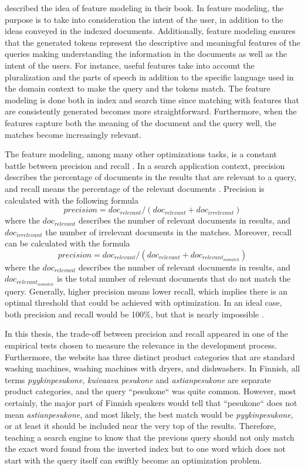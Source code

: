 \citeauthor{relevantSearch} \cite{relevantSearch} described the idea of feature modeling in their book.
In feature modeling, the purpose is to take into consideration the intent of the user, 
in addition to the ideas conveyed in the indexed documents.
Additionally, feature modeling ensures that the generated tokens represent the descriptive and meaningful
features of the queries making understanding the information in the documents as well as the intent of the users.
For instance, useful features take into account the pluralization and the parts of speech in addition to the specific language
used in the domain context to make the query and the tokens match.
The feature modeling is done both in index and search time
since matching with features that are consistently generated becomes more straightforward. 
Furthermore, when the features capture both the meaning of the document and the query well, 
the matches become increasingly relevant.
\cite{relevantSearch}

The feature modeling, among many other optimizations tasks, is a constant battle between 
precision and recall \cite{relevantSearch}.
In a search application context, precision describes the percentage of documents in the results 
that are relevant to a query, and recall means the percentage of the relevant documents \cite{relevantSearch}.
Precision is calculated with the following formula
\[ precision = doc_{relevant} / (doc_{relevant} + doc_{irrelevant}) \]
where the $doc_{relevant}$ describes the number of relevant documents in results, and $doc_{irrelevant}$
the number of irrelevant documents in the matches.
Moreover, recall can be calculated with the formula
\[ precision = doc_{relevant} / (doc_{relevant} + doc_{relevant_{no match}}) \]
where the $doc_{relevant}$ describes the number of relevant documents in results, 
and $doc_{relevant_{no match}}$ is the total number of relevant documents that do not match
the query.
Generally, higher precision means lower recall, which implies there is an optimal threshold 
that could be achieved with optimization.
In an ideal case, both precision and recall would be 100\%, but that is nearly impossible \cite{relevantSearch}.


In this thesis, the trade-off between precision and recall appeared in one of the empirical tests 
chosen to measure the relevance in the development process.
Furthermore, the website has three distinct product categories that are standard washing machines,
washing machines with dryers, and dishwashers.
In Finnish, all terms
\emph{pyykinpesukone}, \emph{kuivaava pesukone} and \emph{astianpesukone} 
are separate product categories, and the query ``pesukone`` was quite common.
However, most certainly, the major part of Finnish speakers would tell that ``pesukone`` does not mean 
\emph{astianpesukone}, and most likely, the best match would be \emph{pyykinpesukone}, or 
at least it should be included near the very top of the results.
Therefore, teaching a search engine to know that the previous query 
should not only match the exact word found from the inverted index 
but to one word which does not start with the query itself can swiftly become an optimization problem.


